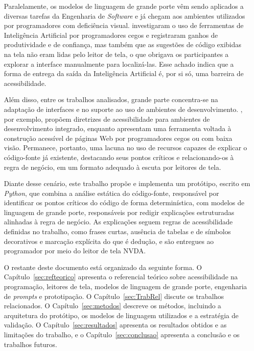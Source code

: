 \documentclass[
    12pt,                   %
    openright,              %
    oneside,                %
    a4paper,                %
    sumario=tradicional,    %
    english,                %
    brazil,                 %
    ]{abntex2}
\begin{document}
Paralelamente, os modelos de linguagem de grande porte vêm sendo aplicados a diversas tarefas da Engenharia de \textit{Software} \cite{hou2024llmse} e já chegam aos ambientes utilizados por programadores com deficiência visual. \textcite{latinoware34224} investigaram o uso de ferramentas de Inteligência Artificial por programadores cegos e registraram ganhos de produtividade e de confiança, mas também que as sugestões de código exibidas na tela não eram lidas pelo leitor de tela, o que obrigava os participantes a explorar a interface manualmente para localizá-las. Esse achado indica que a forma de entrega da saída da Inteligência Artificial é, por si só, uma barreira de acessibilidade.

Além disso, entre os trabalhos analisados, grande parte concentra-se na adaptação de interfaces e no suporte ao uso de ambientes de desenvolvimento. \textcite{latinoware37693}, por exemplo, propõem diretrizes de acessibilidade para ambientes de desenvolvimento integrado, enquanto \textcite{latinoware40920} apresentam uma ferramenta voltada à construção acessível de páginas Web por programadores cegos ou com baixa visão. Permanece, portanto, uma lacuna no uso de recursos capazes de explicar o código-fonte já existente, destacando seus pontos críticos e relacionando-os à regra de negócio, em um formato adequado à escuta por leitores de tela.

Diante desse cenário, este trabalho propõe e implementa um protótipo, escrito em \textit{Python}, que combina a análise estática do código-fonte, responsável por identificar os pontos críticos do código de forma determinística, com modelos de linguagem de grande porte, responsáveis por redigir explicações estruturadas alinhadas à regra de negócio. As explicações seguem regras de acessibilidade definidas no trabalho, como frases curtas, ausência de tabelas e de símbolos decorativos e marcação explícita do que é dedução, e são entregues ao programador por meio do leitor de tela NVDA.

O restante deste documento está organizado da seguinte forma. O Capítulo~\ref{sec:refteorico} apresenta o referencial teórico sobre acessibilidade na programação, leitores de tela, modelos de linguagem de grande porte, engenharia de \textit{prompts} e prototipação. O Capítulo~\ref{sec:TrabRel} discute os trabalhos relacionados. O Capítulo~\ref{sec:metodos} descreve os métodos, incluindo a arquitetura do protótipo, os modelos de linguagem utilizados e a estratégia de validação. O Capítulo~\ref{sec:resultados} apresenta os resultados obtidos e as limitações do trabalho, e o Capítulo~\ref{sec:conclusao} apresenta a conclusão e os trabalhos futuros.
\end{document}
